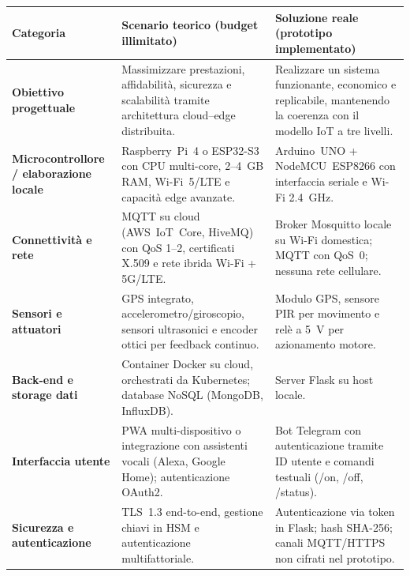 \begin{minipage}{0.85\textwidth}
\renewcommand{\arraystretch}{1.4}
\setlength{\tabcolsep}{6pt}
\footnotesize
{}
\begin{tabular}{p{3.2cm} p{5cm} p{5cm}}
\toprule
\textbf{Categoria} & \textbf{Scenario teorico (budget illimitato)} & \textbf{Soluzione reale (prototipo implementato)} \\
\midrule

\textbf{Obiettivo progettuale} &
Massimizzare prestazioni, affidabilità, sicurezza e scalabilità tramite architettura cloud--edge distribuita. &
Realizzare un sistema funzionante, economico e replicabile, mantenendo la coerenza con il modello IoT a tre livelli. \\

\textbf{Microcontrollore / elaborazione locale} &
Raspberry~Pi~4 o ESP32-S3 con CPU multi-core, 2--4~GB RAM, Wi-Fi~5/LTE e capacità edge avanzate. &
Arduino~UNO + NodeMCU~ESP8266 con interfaccia seriale e Wi-Fi 2.4~GHz. \\

\textbf{Connettività e rete} &
MQTT su cloud (AWS~IoT~Core, HiveMQ) con QoS 1--2, certificati X.509 e rete ibrida Wi-Fi + 5G/LTE. &
Broker Mosquitto locale su Wi-Fi domestica; MQTT con QoS~0; nessuna rete cellulare. \\

\textbf{Sensori e attuatori} &
GPS integrato, accelerometro/giroscopio, sensori ultrasonici e encoder ottici per feedback continuo. &
Modulo GPS, sensore PIR per movimento e relè a 5~V per azionamento motore. \\

\textbf{Back-end e storage dati} &
Container Docker su cloud, orchestrati da Kubernetes; database NoSQL (MongoDB, InfluxDB). &
Server Flask su host locale. \\

\textbf{Interfaccia utente} &
PWA multi-dispositivo o integrazione con assistenti vocali (Alexa, Google Home); autenticazione OAuth2. &
Bot Telegram con autenticazione tramite ID utente e comandi testuali (/on, /off, /status). \\

\textbf{Sicurezza e autenticazione} &
TLS~1.3 end-to-end, gestione chiavi in HSM e autenticazione multifattoriale. &
Autenticazione via token in Flask; hash SHA-256; canali MQTT/HTTPS non cifrati nel prototipo. \\


\end{tabular}
\end{minipage}
